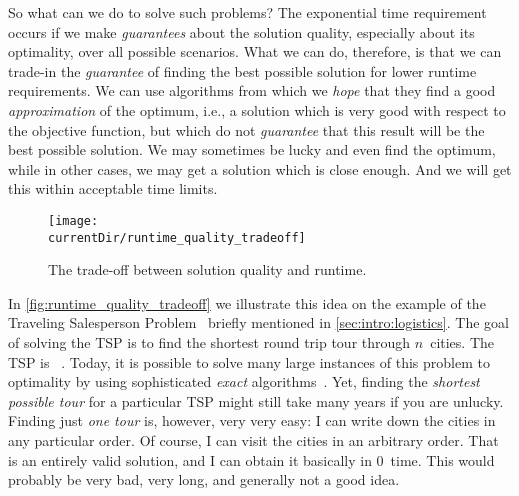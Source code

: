 So what can we do to solve such problems?
The exponential time requirement occurs if we make \emph{guarantees} about the solution quality, especially about its optimality, over all possible scenarios.
What we can do, therefore, is that we can trade-in the \emph{guarantee} of finding the best possible solution for lower runtime requirements.
We can use algorithms from which we \emph{hope} that they find a good \emph{approximation} of the optimum, i.e., a solution which is very good with respect to the objective function, but which do not \emph{guarantee} that this result will be the best possible solution.
We may sometimes be lucky and even find the optimum, while in other cases, we may get a solution which is close enough.
And we will get this within acceptable time limits.

\begin{figure}%
\centering%
\texttt{[image: \\currentDir/runtime\_quality\_tradeoff]}%
\caption{The trade-off between solution quality and runtime.}%
\label{fig:runtime_quality_tradeoff}%
\end{figure}

In \autoref{fig:runtime_quality_tradeoff} we illustrate this idea on the example of the Traveling Salesperson Problem~\cite{ABCC2006TTSPACS,LLRKS1985TTSPAGTOCO,GP2002TTSPAIV} briefly mentioned in \autoref{sec:intro:logistics}.
The goal of solving the TSP is to find the shortest round trip tour through $n$~cities.
The TSP is \NPhard~\cite{GJ1979CAIAGTTTONC,GP2002TTSPAIV}. 
Today, it is possible to solve many large instances of this problem to optimality by using sophisticated \emph{exact} algorithms~\cite{CEG2007CWDPIFTSPT,C2021WT}.
Yet, finding the \emph{shortest possible tour} for a particular TSP might still take many years if you are unlucky.
Finding just \emph{one tour} is, however, very very easy:
I can write down the cities in any particular order.
Of course, I can visit the cities in an arbitrary order.
That is an entirely valid solution, and I can obtain it basically in 0~time.
This  would probably be very bad, very long, and generally not a good idea.

